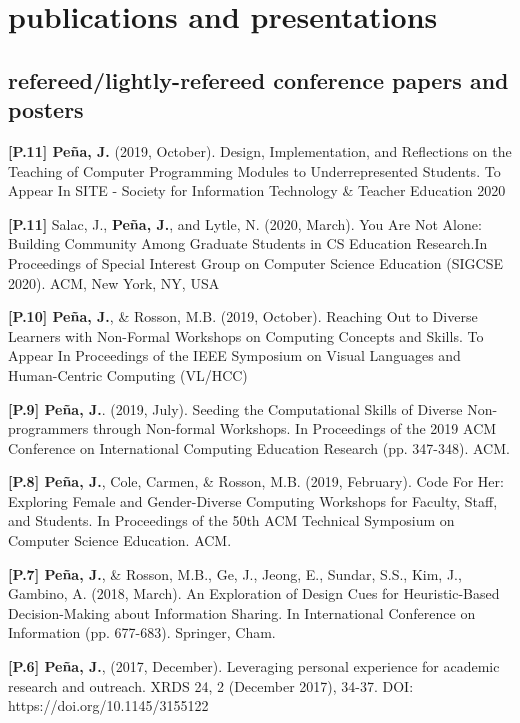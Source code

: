 \documentclass[]{cv-style}          %
\begin{document}

\section{publications and presentations}
  \vspace{-0.2cm}

\subsection{refereed/lightly-refereed conference papers and posters}
{\textbf{[P.11] Peña, J.} (2019, October). Design, Implementation, and Reflections on the Teaching of Computer Programming Modules to Underrepresented Students. To Appear In SITE - Society for Information Technology \& Teacher Education 2020}

{\textbf{[P.11]} Salac, J., {\textbf{Peña, J.}}, and Lytle, N. (2020, March). You Are Not Alone: Building Community Among Graduate Students in CS Education Research.In Proceedings of Special Interest Group on Computer Science Education (SIGCSE 2020). ACM, New York, NY, USA}

{\textbf{[P.10] Peña, J.}, \& Rosson, M.B. (2019, October). Reaching Out to Diverse Learners with Non-Formal Workshops on Computing Concepts and Skills. To Appear In Proceedings of the IEEE Symposium on Visual Languages and Human-Centric Computing (VL/HCC)}

{\textbf{[P.9] Peña, J.}. (2019, July). Seeding the Computational Skills of Diverse Non-programmers through Non-formal Workshops. In Proceedings of the 2019 ACM Conference on International Computing Education Research (pp. 347-348). ACM.}

{\textbf{[P.8] Peña, J.}, Cole, Carmen, \& Rosson, M.B. (2019, February). Code For Her: Exploring Female and Gender-Diverse Computing Workshops for Faculty, Staff, and Students. In Proceedings of the 50th ACM Technical Symposium on Computer Science Education. ACM.{}}

{\textbf{[P.7] Peña, J.}, \& Rosson, M.B., Ge, J., Jeong, E., Sundar, S.S., Kim, J., Gambino, A. (2018, March). An Exploration of Design Cues for Heuristic-Based Decision-Making about Information Sharing. In International Conference on Information (pp. 677-683). Springer, Cham.{} 

{\textbf{[P.6] Peña, J.}, (2017, December). Leveraging personal experience for academic research and outreach. XRDS 24, 2 (December 2017), 34-37. DOI: https://doi.org/10.1145/3155122 }}
\end{document}
